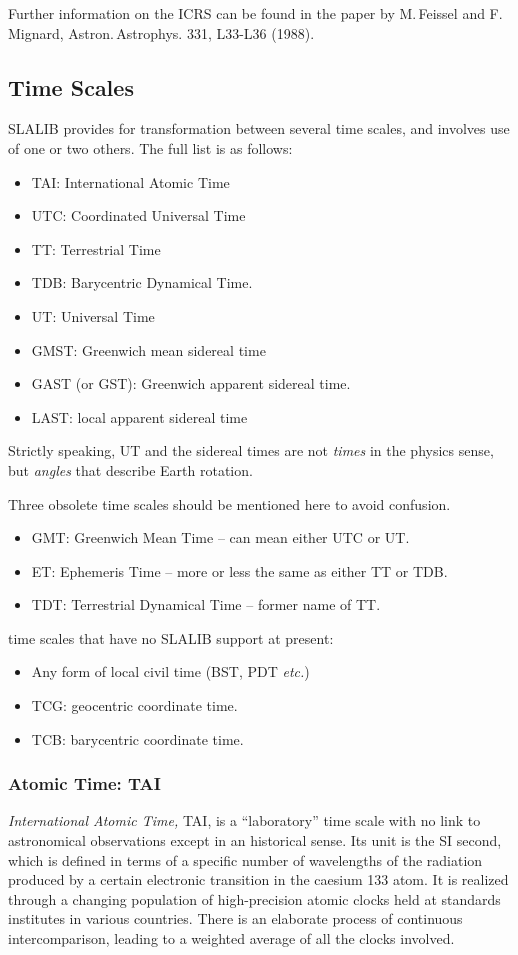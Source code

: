 \documentclass[11pt,twoside,nolof]{starlink}
\begin{document}
Further information on the ICRS can be found in the paper by M.\,Feissel
and F.\,Mignard, Astron.\,Astrophys. 331, L33-L36 (1988).

\subsection{Time Scales}

SLALIB provides for transformation between several time scales, and involves
use of one or two others.  The full list is as follows:
\begin{itemize}
\item TAI: International Atomic Time
\item UTC: Coordinated Universal Time
\item TT: Terrestrial Time
\item TDB: Barycentric Dynamical Time.
\item UT: Universal Time
\item GMST: Greenwich mean sidereal time
\item GAST (or GST): Greenwich apparent sidereal time.
\item LAST: local apparent sidereal time
\end{itemize}
Strictly speaking, UT and the sidereal times are not \textit{times}\/ in
the physics sense, but \textit{angles}\/ that describe Earth rotation.

Three obsolete time scales should be mentioned here to avoid confusion.
\begin{itemize}
\item GMT: Greenwich Mean Time -- can mean either UTC or UT.
\item ET: Ephemeris Time -- more or less the same as either TT or TDB.
\item TDT: Terrestrial Dynamical Time -- former name of TT.
\end{itemize}

time scales that have no SLALIB support at present:
\begin{itemize}
\item Any form of local civil time (BST, PDT \textit{etc.})
\item TCG: geocentric coordinate time.
\item TCB: barycentric coordinate time.
\end{itemize}

\subsubsection{Atomic Time: TAI}
\textit{International Atomic Time,} TAI, is a ``laboratory''
time scale with no link to astronomical observations
except in an historical sense.  Its
unit is the SI second, which is defined in terms of a
specific number
of wavelengths of the radiation produced by a certain electronic
transition in the caesium 133 atom.  It
is realized through a changing
population of high-precision atomic clocks held
at standards institutes in various countries.  There is an
elaborate process of continuous intercomparison, leading to
a weighted average of all the clocks involved.
\end{document}
